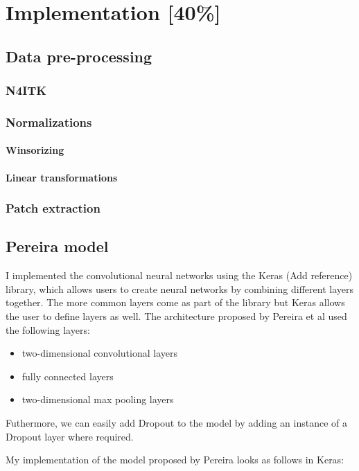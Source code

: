 \documentclass[12pt,a4paper,twoside,openright]{report}
\begin{document}
\chapter{Implementation [40\%]}

\section{Data pre-processing}

\subsection{N4ITK}
\subsection{Normalizations}
\subsubsection{Winsorizing}
\subsubsection{Linear transformations}

\subsection{Patch extraction}


\section{Pereira model}
I implemented the convolutional neural networks using the Keras (Add reference) library, which allows users to create neural networks by combining different layers together. The more common layers come as part of the library but Keras allows the user to define layers as well.  The architecture proposed by Pereira et al \cite{pereira} used the following layers:
\begin{itemize}
	\item two-dimensional convolutional layers
	\item fully connected layers
	\item two-dimensional max pooling layers
\end{itemize}
Futhermore, we can easily add Dropout to the model by adding an instance of a Dropout layer where required. 

My implementation of the model proposed by Pereira \cite{pereira} looks as follows in Keras:

\end{document}
